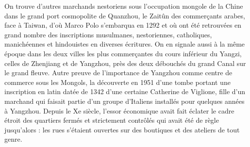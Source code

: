On trouve d'autres marchands nestoriens sous l'occupation mongole de la
Chine dans le grand port cosmopolite de Quanzhou, le Zaitûn des
commerçants arabes, face à Taiwan, d'où Marco Polo s'embarqua en 1292 et
où ont été retrouvées en grand nombre des inscriptions musulmanes,
nestoriennes, catholiques, manichéennes et hindouistes en diverses
écritures. On en signale aussi à la même époque dans les deux villes les
plus commerçantes du cours inférieur du Yangzi, celles de Zhenjiang et
de Yangzhou, près des deux débouchés du grand Canal sur le grand fleuve.
Autre preuve de l'importance de Yangzhou comme centre de commerce sous
les Mongols, la découverte en 1951 d'une tombe portant une inscription
en latin datée de 1342 d'une certaine Catherine de Viglione, fille
d'un marchand qui faisait partie d'un groupe d'Italiens installés pour
quelques années à Yangzhou. Depuis le Xe siècle, l'essor économique
avait fait éclater le cadre étroit des quartiers fermés et strictement
contrôlés qui avait été de règle jusqu'alors : les rues s'étaient
ouvertes sur des boutiques et des ateliers de tout genre.

